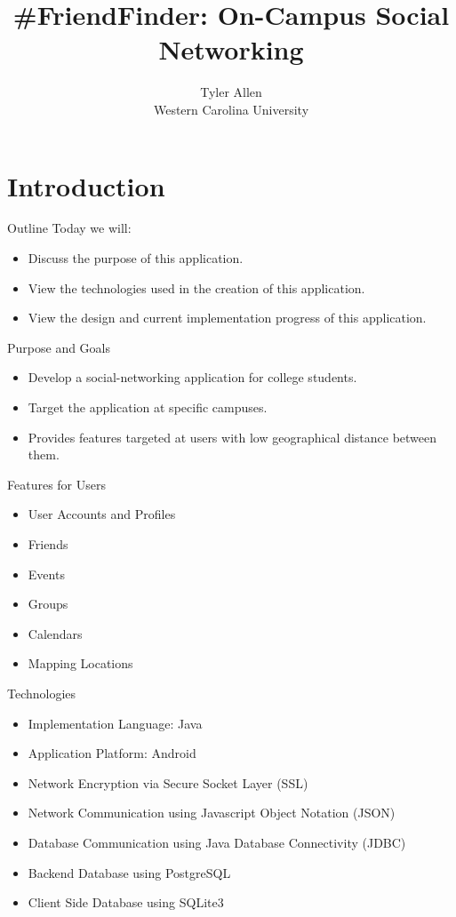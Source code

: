 \documentclass{beamer}
\title[\#FriendFinder]{\#FriendFinder: On-Campus Social Networking}
\author[Allen]{Tyler Allen\\ \footnotesize Western Carolina University}
\begin{document}
\section{Introduction}
\begin{frame}
\begin{center}
\maketitle
\end{center}
\end{frame}

\begin{frame}{Outline}
Today we will:
\begin{itemize}
\item Discuss the purpose of this application.
\item View the technologies used in the creation of this application.
\item View the design and current implementation progress of this application.
\end{itemize}
\end{frame}

\begin{frame}{Purpose and Goals}
\begin{itemize}
\item Develop a social-networking application for college students.
\item Target the application at specific campuses.
\item Provides features targeted at users with low geographical distance between them.
\end{itemize}
\end{frame}

\begin{frame}{Features for Users}
\begin{itemize}
\item User Accounts and Profiles
\item Friends
\item Events
\item Groups
\item Calendars
\item Mapping Locations
\end{itemize}
\end{frame}

\begin{frame}{Technologies}
\begin{itemize}
\item Implementation Language: Java
\item Application Platform: Android
\item Network Encryption via Secure Socket Layer (SSL)
\item Network Communication using Javascript Object Notation (JSON)
\item Database Communication using Java Database Connectivity (JDBC)
\item Backend Database using PostgreSQL
\item Client Side Database using SQLite3
\end{itemize}
\end{frame}
\end{document}
